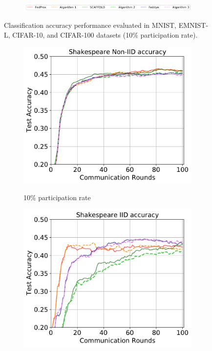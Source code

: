 \documentclass{article} %
\begin{document}
\begin{figure}[ht!]
\begin{subfigure}{.5\textwidth}
  \label{fig:sub1-eighth}
\end{subfigure}
\begin{subfigure}{1\textwidth}
  \centering
  \includegraphics[width=1\linewidth]{textfigure/legend.pdf}
  \label{fig:sub1-11}
\end{subfigure}
\caption{Classification accuracy performance evaluated in MNIST, EMNIST-L, CIFAR-10, and CIFAR-100 datasets (10\% participation rate). }
\label{fig:maintextacc}
\end{figure}

\begin{figure}[ht!]
\begin{subfigure}{.5\textwidth}
  \centering
  \includegraphics[width=.8\linewidth]{textfigure/Shakespeare_noniid.pdf}
  \label{fig:sub-1}
  \caption{10\% participation rate}
\end{subfigure}
\begin{subfigure}{.5\textwidth}
  \centering
  \includegraphics[width=.8\linewidth]{textfigure/Shakespeare_iid.pdf}

\end{subfigure}
\end{figure}
\end{document}
